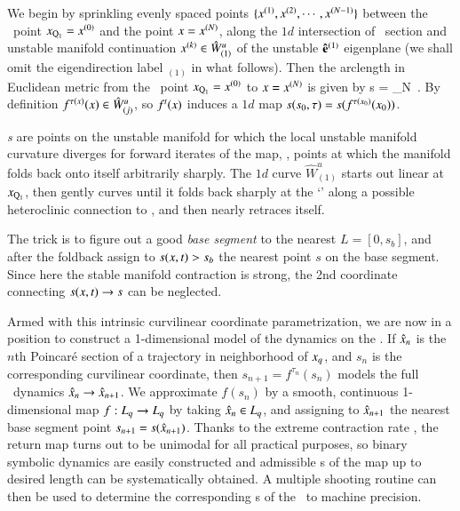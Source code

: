 \documentclass[preprint,number,sort&compress]{elsarticle}
\begin{document}
We begin by sprinkling evenly spaced points
$\{x^{(1)},x^{(2)},\cdots,x^{(N-1)}\}$ between the
\reqv\ point $x_{\mathrm{Q}_{1}}=x^{(0)}$ and the point
$x= x^{(N)}$, along the $1d$ intersection of \Poincare\
section and unstable manifold continuation $x^{(k)} \in
\hat{W}^u_{(1)}$ of the unstable ${\bf \hat{e}}^{(1)}$
eigen\-plane (we shall omit the eigen\-direction label
${}_{(1)}$ in what follows). Then the arclength in Euclidean
metric from the
\reqv\ point $x_{\mathrm{Q}_{1}}=x^{(0)}$ to $x=
x^{(N)}$ is given by
\beq
s = \lim_{N\to\infty}
\,.
By definition $f^{\tau(x)}(x) \in \hat{W}^u_{(j)}$, so
$f^t(x)$ induces a $1d$ map $s(s_0,\tau) =
s(f^{\tau({x_0})}({x_0}))$.

{\em \Turn s} are points on the unstable manifold for which
the local unstable manifold curvature diverges for forward
iterates of the map, \ie, points at which the manifold folds
back onto itself arbitrarily sharply. The $1d$ curve $\hat{W}^u_{(1)}$
starts out linear at $x_{\mathrm{Q}_{1}}$, then gently curves
until it folds back sharply at the `\turn' along a possible
heteroclinic connection to , and then nearly retraces
itself.


The trick is to figure out a good {\em base segment} to the
nearest {\turn} $L=[0,s_{b}]$, and after the foldback assign
to $s(x,t)>s_{b}$ the nearest point $s$ on the base
segment. Since here the stable manifold contraction is strong, the
2nd coordinate connecting $s(x,t) \to s$ can be neglected.

Armed with this intrinsic curvilinear coordinate
parametrization, we are now in a position to construct a
1-dimensional model of the dynamics on the \nws. If
$\hat{x}_n$ is the $n$th Poincar\'e section of a
trajectory in neighborhood of $x_q$, and $s_n$ is the
corresponding curvilinear coordinate, then $s_{n+1} =
f^{\tau_n}(s_n)$ models the full \statesp\ dynamics
$\hat{x}_n \to \hat{x}_{n+1}$. We approximate $f(s_n)$
by a smooth, continuous 1-dimensional map $f : L_q \to
L_q$ by taking $\hat{x}_n \in L_q$, and
assigning to $\hat{x}_{n+1}$ the nearest base segment
point $s_{n+1}=s(\hat{x}_{n+1})$. Thanks to the extreme
contraction rate , the return map turns out to
be unimodal for all practical purposes, so binary symbolic dynamics are easily
constructed and admissible \po s of the map up to desired length can be
systematically obtained. A multiple shooting routine\rf{DasBuch} can then be
used to determine the corresponding \rpo s
of the \cLe\ to machine precision.
\end{document}
